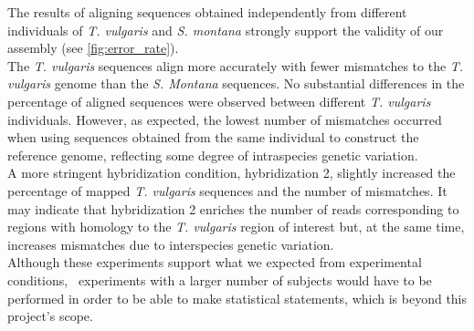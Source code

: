 
The results of aligning sequences obtained independently from different individuals of \textit{T. vulgaris} and \textit{S. montana} strongly support the validity of our assembly (see \autoref{fig:error_rate}).\\

The \textit{T. vulgaris} sequences align more accurately with fewer mismatches to the \textit{T. vulgaris} genome than the \textit{S. Montana} sequences. No substantial differences in the percentage of aligned sequences were observed between different \textit{T. vulgaris} individuals. However, as expected, the lowest number of mismatches occurred when using sequences obtained from the same individual to construct the reference genome, reflecting some degree of intraspecies genetic variation.\\

A more stringent hybridization condition, hybridization 2, slightly increased the percentage of mapped \textit{T. vulgaris} sequences and the number of mismatches. It may indicate that hybridization 2 enriches the number of reads corresponding to regions with homology to the \textit{T. vulgaris} region of interest but, at the same time, increases mismatches due to interspecies genetic variation.\\

Although these experiments support what we expected from experimental conditions,~\cite{bataillonGenotypePhenotypeGenetic2022} experiments with a larger number of subjects would have to be performed in order to be able to make statistical statements, which is beyond this project's scope.